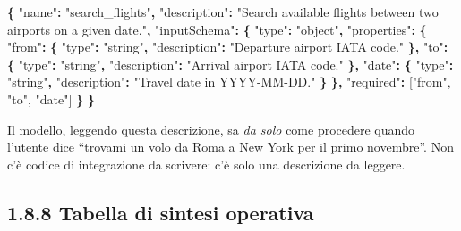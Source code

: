 \documentclass[
  italian,
  10pt,
]{book}
\newenvironment{Shaded}{\begin{snugshade}}{\end{snugshade}}
\newcommand{\DataTypeTok}[1]{\textcolor[rgb]{0.13,0.29,0.53}{#1}}
\newcommand{\FunctionTok}[1]{\textcolor[rgb]{0.13,0.29,0.53}{\textbf{#1}}}
\newcommand{\OtherTok}[1]{\textcolor[rgb]{0.56,0.35,0.01}{#1}}
\newcommand{\StringTok}[1]{\textcolor[rgb]{0.31,0.60,0.02}{#1}}
\begin{document}
\begin{Shaded}
\begin{Highlighting}[]
\FunctionTok{\{}
  \DataTypeTok{"name"}\FunctionTok{:} \StringTok{"search\_flights"}\FunctionTok{,}
  \DataTypeTok{"description"}\FunctionTok{:} \StringTok{"Search available flights between two airports on a given date."}\FunctionTok{,}
  \DataTypeTok{"inputSchema"}\FunctionTok{:} \FunctionTok{\{}
    \DataTypeTok{"type"}\FunctionTok{:} \StringTok{"object"}\FunctionTok{,}
    \DataTypeTok{"properties"}\FunctionTok{:} \FunctionTok{\{}
      \DataTypeTok{"from"}\FunctionTok{:} \FunctionTok{\{} \DataTypeTok{"type"}\FunctionTok{:} \StringTok{"string"}\FunctionTok{,} \DataTypeTok{"description"}\FunctionTok{:} \StringTok{"Departure airport IATA code."} \FunctionTok{\},}
      \DataTypeTok{"to"}\FunctionTok{:}   \FunctionTok{\{} \DataTypeTok{"type"}\FunctionTok{:} \StringTok{"string"}\FunctionTok{,} \DataTypeTok{"description"}\FunctionTok{:} \StringTok{"Arrival airport IATA code."} \FunctionTok{\},}
      \DataTypeTok{"date"}\FunctionTok{:} \FunctionTok{\{} \DataTypeTok{"type"}\FunctionTok{:} \StringTok{"string"}\FunctionTok{,} \DataTypeTok{"description"}\FunctionTok{:} \StringTok{"Travel date in YYYY{-}MM{-}DD."} \FunctionTok{\}}
    \FunctionTok{\},}
    \DataTypeTok{"required"}\FunctionTok{:} \OtherTok{[}\StringTok{"from"}\OtherTok{,} \StringTok{"to"}\OtherTok{,} \StringTok{"date"}\OtherTok{]}
  \FunctionTok{\}}
\FunctionTok{\}}
\end{Highlighting}
\end{Shaded}

Il modello, leggendo questa descrizione, sa \emph{da solo} come
procedere quando l'utente dice ``trovami un volo da Roma a New York per
il primo novembre''. Non c'è codice di integrazione da scrivere: c'è
solo una descrizione da leggere.

\subsection{1.8.8 Tabella di sintesi
operativa}\label{tabella-di-sintesi-operativa}
\end{document}

